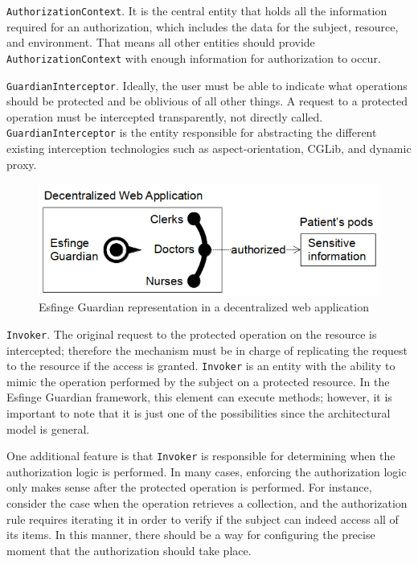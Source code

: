 \documentclass[sigconf]{acmart}
\begin{document}
\vspace{0.8mm} \noindent \verb|AuthorizationContext|. It is the central entity that holds all the information required for an authorization, which includes the data for the subject, resource, and environment. That means all other entities should provide \verb|AuthorizationContext| with enough information for authorization to occur.

\vspace{0.8mm} \noindent \verb|GuardianInterceptor|.
Ideally, the user must be able to indicate what operations should be protected and be oblivious of all other things. A request to a protected operation must be intercepted transparently, not directly called. \verb|GuardianInterceptor| is the entity responsible for abstracting the different existing interception technologies such as aspect-orientation, CGLib, and dynamic proxy.

\begin{figure}
  \centering
  \includegraphics[scale=0.5]{img/guardian-in-decentralized-webapp.png}
  \caption{Esfinge Guardian representation in a decentralized web application}
  \label{fig:guardian-in-decentralized-webapp}
\end{figure}

\vspace{0.8mm} \noindent \verb|Invoker|.
The original request to the protected operation on the resource is intercepted; therefore the mechanism must be in charge of replicating the request to the resource if the access is granted. \verb|Invoker| is an entity with the ability to mimic the operation performed by the subject on a protected resource. In the Esfinge Guardian framework, this element can execute methods; however, it is important to note that it is just one of the possibilities since the architectural model is general.

One additional feature is that \verb|Invoker| is responsible for determining when the authorization logic is performed. In many cases, enforcing the authorization logic only makes sense after the protected operation is performed. For instance, consider the case when the operation retrieves a collection, and the authorization rule requires iterating it in order to verify if the subject can indeed access all of its items. In this manner, there should be a way for configuring the precise moment that the authorization should take place.
\end{document}
